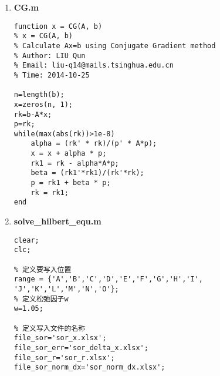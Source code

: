 \documentclass[a4paper]{article}
\begin{document}
\begin{CJK*}{GBK}{song}
\begin{enumerate}[(1)]
\item \textbf{CG.m} \\
\begin{lstlisting}
function x = CG(A, b)
% x = CG(A, b)
% Calculate Ax=b using Conjugate Gradient method
% Author: LIU Qun
% Email: liu-q14@mails.tsinghua.edu.cn
% Time: 2014-10-25

n=length(b);
x=zeros(n, 1);
rk=b-A*x;
p=rk;
while(max(abs(rk))>1e-8)
    alpha = (rk' * rk)/(p' * A*p);
    x = x + alpha * p;
    rk1 = rk - alpha*A*p;
    beta = (rk1'*rk1)/(rk'*rk);
    p = rk1 + beta * p;
    rk = rk1;
end
\end{lstlisting}

\item \textbf{solve\_hilbert\_equ.m}
\begin{lstlisting}
clear;
clc;

% 定义要写入位置
range = {'A','B','C','D','E','F','G','H','I', 'J','K','L','M','N','O'};
% 定义松弛因子w
w=1.05;

% 定义写入文件的名称
file_sor='sor_x.xlsx';
file_sor_err='sor_delta_x.xlsx';
file_sor_r='sor_r.xlsx';
file_sor_norm_dx='sor_norm_dx.xlsx';


\end{lstlisting}
\end{enumerate}
\end{CJK*}
\end{document}
